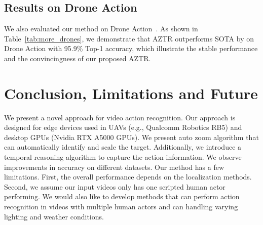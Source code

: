 \documentclass[letterpaper, 10 pt, conference]{ieeeconf}
\begin{document}
\subsection{Results on Drone Action}
\begin{table}
\centering
{}
\caption{Results on dataset: Drone Action. We demonstrate that AZTR improves the state-of-the-art accuracy by 3.2\%, reaching 95.9\% on Drone Action. Trained on high-end desktop GPUs.}
\vspace{-10pt}
\label{tab:more_drones}
\end{table}
 
We also evaluated our method on Drone Action~\cite{perera2019drone}. As shown in Table~\ref{tab:more_drones}, we demonstrate that AZTR outperforms SOTA by  on Drone Action with 95.9\% Top-1 accuracy, which illustrate the stable performance and the convincingness of our proposed AZTR. 

 \section{Conclusion, Limitations and Future}
\label{sec: conclusion}

We present a novel approach for video action recognition. Our approach is designed for edge devices used in UAVs (e.g., Qualcomm Robotics RB5) and desktop GPUs (Nvidia RTX A5000 GPUs). We present auto zoom algorithm that can automatically identify and scale the target. Additionally, we introduce a temporal reasoning algorithm to capture the action information. We observe improvements in accuracy on different datasets. Our method has a few limitations. First, the overall performance depends on the localization methods. Second, we assume our input videos only has one scripted human actor performing. We would also like to develop methods that can perform action recognition in videos with multiple human actors and can handling varying lighting and weather conditions.\\
 



\end{document}
